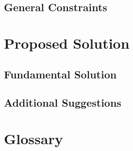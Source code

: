 \documentclass[12pt]{article}
\begin{document}
                    \subsection{General Constraints}
                    
               \section{Proposed Solution}
                                   \subsection{Fundamental Solution }
                                   \subsection{Additional Suggestions}
                                  
                                   
                    
                    
                
                \section{Glossary}
        
                
                        
        
        
\end{document}
